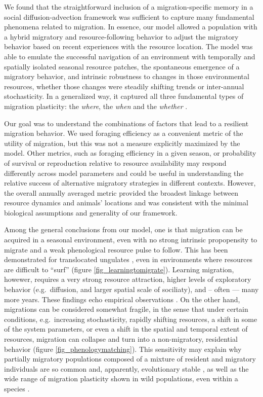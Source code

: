\documentclass[utf8]{frontiersSCNS} %
\begin{document}
	We found that the straightforward inclusion of a migration-specific memory in a social diffusion-advection framework was sufficient to capture many fundamental phenomena related to migration. In essence, our model allowed a population with a hybrid migratory and resource-following behavior to adjust the migratory behavior based on recent experiences with the resource location. The model was able to emulate the successful navigation of an environment with temporally and spatially isolated seasonal resource patches, the spontaneous emergence of a migratory behavior, and intrinsic robustness to changes in those environmental resources, whether those changes were steadily shifting trends or inter-annual stochasticity.  In a generalized way, it captured all three fundamental types of migration plasticity: the \textit{where}, the \textit{when} and the \textit{whether} \citep{Xu2021}.
	
	Our goal was to understand the combinations of factors that lead to a resilient migration behavior. We used foraging efficiency as a convenient metric of the utility of migration, but this was not a measure explicitly maximized by the model. Other metrics, such as foraging efficiency in a given season, or probability of survival or reproduction relative to resource availability \citep{Bauer2020} may respond differently across model parameters and could be useful in understanding the relative success of alternative migratory strategies in different contexts. However, the overall annually averaged metric provided the broadest linkage between resource dynamics and animals' locations and was consistent with the minimal biological assumptions and generality of our framework.
	
	Among the general conclusions from our model, one is that migration can be acquired in a seasonal environment, even with no strong intrinsic propopensity to migrate and a weak phenological resource pulse to follow. This has been demonstrated for translocated ungulates \citep{Jesmer2018}, even in environments where resources are difficult to ``surf'' (figure \ref{fig_learningtomigrate}). Learning migration, howewer, requires a very strong resource attraction, higher levels of exploratory behavior (e.g.~diffusion, and larger spatial scale of sociliaty), and -- often --- many more years. These findings echo empirical observations \citep{Jesmer2018}.  On the other hand, migrations can be considered somewhat fragile, in the sense that under certain conditions, e.g.~increasing stochasticity, rapidly shifting resources, a shift in some of the system parameters, or even a shift in the spatial and temporal extent of resources, migration can collapse and turn into a non-migratory, residential behavior (figure \ref{fig_phenologymatching}). This sensitivity may explain why partially migratory populations composed of a mixture of resident and migratory individuals are so common and, apparently, evolutionary stable \citep{Berthold1999, Chapman2011}, as well as the wide range of migration plasticity shown in wild populations, even within a species \citep{Xu2021}.
		
\end{document}
